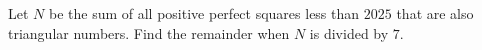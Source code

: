 Let $N$ be the sum of all positive perfect squares less than $2025$ that are also triangular numbers. Find the remainder when $N$ is divided by $7$.
